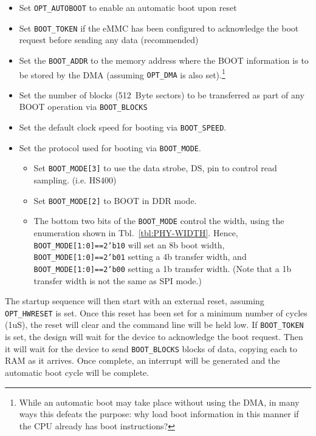 \documentclass{gqtekspec}
\begin{document}
\begin{itemize}
\item Set {\tt OPT\_AUTOBOOT} to enable an automatic boot upon reset
\item Set {\tt BOOT\_TOKEN} if the eMMC has been configured to acknowledge
	the boot request before sending any data (recommended)
\item Set the {\tt BOOT\_ADDR} to the memory address where the BOOT information
	is to be stored by the DMA (assuming {\tt OPT\_DMA} is also
	set).\footnote{While an automatic boot may take place without using
	the DMA, in many ways this defeats the purpose: why load boot
	information in this manner if the CPU already has boot instructions?}
\item Set the number of blocks (512~Byte sectors) to be transferred as part of
	any BOOT operation via {\tt BOOT\_BLOCKS}
\item Set the default clock speed for booting via {\tt BOOT\_SPEED}.
\item Set the protocol used for booting via {\tt BOOT\_MODE}.

	\begin{itemize}
	\item Set {\tt BOOT\_MODE[3]} to use the data strobe, DS, pin to
		control read sampling.  (i.e. HS400)

	\item Set {\tt BOOT\_MODE[2]} to BOOT in DDR mode.

	\item The bottom two bits of the {\tt BOOT\_MODE} control the width,
		using the enumeration shown in Tbl.~\ref{tbl:PHY-WIDTH}.
		Hence, {\tt BOOT\_MODE[1:0]==2'b10} will set an 8b boot width,
		{\tt BOOT\_MODE[1:0]==2'b01} setting a 4b transfer width,
		and {\tt BOOT\_MODE[1:0]==2'b00} setting a 1b transfer width.
		(Note that a 1b transfer width is not the same as SPI mode.)
	\end{itemize}
\end{itemize}

The startup sequence will then start with an external reset, assuming
{\tt OPT\_HWRESET} is set.  Once this reset has been set for a minimum number
of cycles (1uS), the reset will clear and the command line will be held low.
If {\tt BOOT\_TOKEN} is set, the design will wait for the device to acknowledge
the boot request.  Then it will wait for the device to send {\tt BOOT\_BLOCKS}
blocks of data, copying each to RAM as it arrives.  Once complete, an interrupt
will be generated and the automatic boot cycle will be complete.
\end{document}
